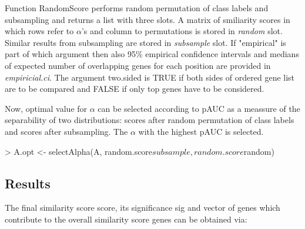 \documentclass[a4paper]{report}
\begin{document}
Function {\ttfamily RandomScore} performs random permutation of class labels and subsampling and returns a list with three slots. A matrix of smiliarity scores in which rows refer to $\alpha$'s and column to permutations is stored in \emph{random} slot. Similar results from subsampling are stored in \emph{subsample} slot. If {\ttfamily "empirical"}  is part of {\ttfamily which} argument then also 95\% empirical confidence intervals and medians of expected number of overlapping genes for each position are provided in \emph{empiricial.ci}. The argument {\ttfamily two.sided} is {\ttfamily TRUE} if both sides of ordered gene list are to be compared and {\ttfamily FALSE} if only top genes have to be considered.\par
Now, optimal value for $\alpha$ can be selected according to pAUC as a meassure of the separability of two distributions: scores after random permutation of class labels and scores after subsampling. The $\alpha$ with  the highest pAUC is selected.\par
\begin{Schunk}
\begin{Sinput}
> A.opt <- selectAlpha(A, random.score$subsample, random.score$random)
\end{Sinput}
\end{Schunk}
\subsection*{Results}
The final similarity score {\ttfamily score}, its significance {\ttfamily sig} and vector of genes which contribute to the overall similarity score {\ttfamily genes} can be obtained via:
\begin{Schunk}
\end{Schunk}
\end{document}
